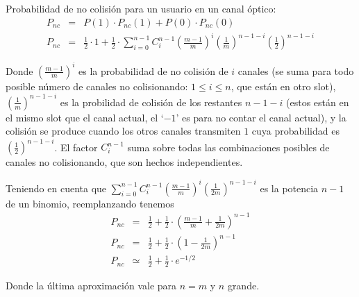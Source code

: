 \noindent Probabilidad de no colisión para un usuario en un canal óptico:
\begin{eqnarray}
P_{nc} & = & P(1) \cdot P_{nc}(1) + P(0) \cdot P_{nc}(0) \\
P_{nc} & = & \frac{1}{2} \cdot 1 +  \frac{1}{2} \cdot \sum_{i=0}^{n-1} 
C^{n-1}_{i} \left(\frac{m-1}{m}\right)^i  \left(\frac{1}{m}\right)^{n-1-i}  \left(\frac{1}{2}\right)^{n-1-i} 
\end{eqnarray}

\noindent Donde $\left(\frac{m-1}{m}\right)^i$ es la probabilidad de no
colisión de $i$ canales (se suma para todo posible número de canales no
colisionando: $1\leq i\leq n$, que están en otro slot), $
\left(\frac{1}{m}\right)^{n-1-i}$ es la probilidad de colisión de los restantes
$n-1-i$ (estos están en el mismo slot que el canal actual, el `$-1$' es para no
contar el canal actual), y la colisión se produce cuando los otros canales
transmiten $1$ cuya probabilidad es $\left(\frac{1}{2}\right)^{n-1-i}$. El
factor $C^{n-1}_{i}$ suma sobre todas las combinaciones posibles de canales no
colisionando, que son hechos independientes.

\noindent Teniendo en cuenta que $ \sum_{i=0}^{n-1}
C^{n-1}_{i} \left(\frac{m-1}{m}\right)^i  \left(\frac{1}{2m}\right)^{n-1-i}$ es la potencia $n-1$ de un binomio, reemplanzando tenemos
\begin{eqnarray}
P_{nc} & = & \frac{1}{2} +  \frac{1}{2} \cdot \left(\frac{m-1}{m} + \frac{1}{2m} \right)^{n-1} \\
P_{nc} & = & \frac{1}{2} +  \frac{1}{2} \cdot \left(1- \frac{1}{2m} \right)^{n-1} \\
P_{nc} & \simeq & \frac{1}{2} +  \frac{1}{2} \cdot e^{-1/2} 
\end{eqnarray}

\noindent Donde la última aproximación vale para $n=m$ y $n$ grande.


\vspace{5mm}

